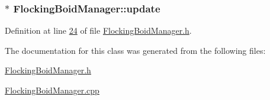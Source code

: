 \hypertarget{class_flocking_boid_manager_a53cd9d7409eb6169290c4447c82c4906}{}
\subsubsection[{update}]{$\ast$ Flocking\+Boid\+Manager\+::update}\label{class_flocking_boid_manager_a53cd9d7409eb6169290c4447c82c4906}


Definition at line \hyperlink{_flocking_boid_manager_8h_source_l00024}{24} of file \hyperlink{_flocking_boid_manager_8h_source}{Flocking\+Boid\+Manager.\+h}.



The documentation for this class was generated from the following files\+:\begin{DoxyCompactItemize}
\item 
\hyperlink{_flocking_boid_manager_8h}{Flocking\+Boid\+Manager.\+h}\item 
\hyperlink{_flocking_boid_manager_8cpp}{Flocking\+Boid\+Manager.\+cpp}\end{DoxyCompactItemize}
